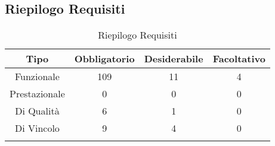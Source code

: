 \subsection{Riepilogo Requisiti}
\normalsize
\begingroup
\renewcommand\arraystretch{2}
\begin{longtable}{|c|c|c|c|}
\hline 
\textbf{Tipo} & \textbf{Obbligatorio} & \textbf{Desiderabile} & \textbf{Facoltativo}\\
\hline
Funzionale & 109 & 11 & 4\\ \hline
Prestazionale & 0 & 0 & 0\\ \hline
Di Qualità & 6 & 1 & 0\\ \hline
Di Vincolo & 9 & 4  & 0\\ \hline
\caption[Riepilogo Requisiti]{Riepilogo Requisiti}
\label{tabella:riepilogorequi}
\end{longtable}
\endgroup
\clearpage

